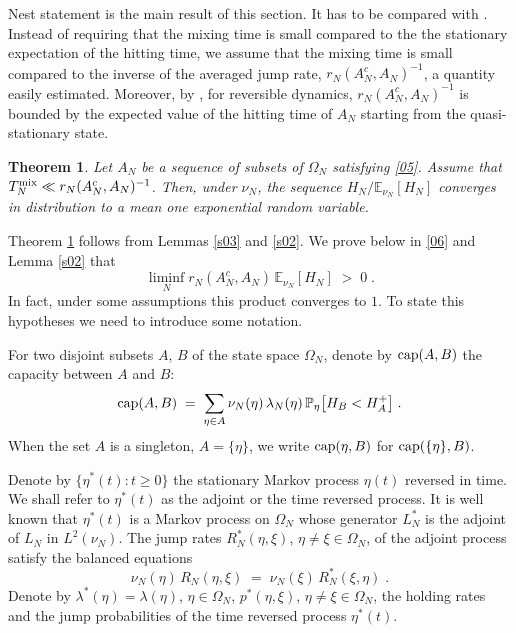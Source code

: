 \documentclass[reqno]{amsart}
\newtheorem{theorem}{Theorem}[section]
\begin{document}
Nest statement is the main result of this section. It has to be
compared with \cite[Theorem 1.4]{a1}. Instead of requiring that the
mixing time is small compared to the the stationary expectation of the
hitting time, we assume that the mixing time is small compared to the
inverse of the averaged jump rate, $r_N(A_N^c, A_N)^{-1}$, a quantity
easily estimated. Moreover, by \cite[Lemma 2.3]{bg1}, for reversible
dynamics, $r_N(A_N^c, A_N)^{-1}$ is bounded by the expected value of
the hitting time of $A_N$ starting from the quasi-stationary state.

\begin{theorem}
\label{s04}
Let $A_N$ be a sequence of subsets of $\Omega_N$ satisfying
\eqref{05}.  Assume that $T^{\rm mix}_N \ll r_N(A_N^c,
A_N)^{-1}$. Then, under $\nu_N$, the sequence $H_N/{{\mathbb E}}_{\nu_N}
[H_N]$ converges in distribution to a mean one exponential random
variable.
\end{theorem}

Theorem \ref{s04} follows from Lemmas \ref{s03} and \ref{s02}.  We
prove below in \eqref{06} and Lemma \ref{s02} that
\begin{equation*}
\liminf_N r_N(A_N^c, A_N) \, {{\mathbb E}}_{\nu_N} [H_N]  \;>\; 0\;.
\end{equation*}
In fact, under some assumptions this product converges to $1$.
To state this hypotheses we need to introduce some notation.

For two disjoint subsets $A$, $B$ of the state space $\Omega_N$,
denote by ${{\rm cap}} (A, B)$ the capacity between $A$ and $B$:
\begin{equation*}
{{\rm cap}} (A, B) \;=\; \sum_{\eta\in A} \nu_N(\eta) \, \lambda_N(\eta)\, 
{{\mathbb P}}_{\eta} \big[ H_B < H^+_{A} \big]\;.
\end{equation*}
When the set $A$ is a singleton, $A=\{\eta\}$, we write ${{\rm cap}}(\eta,
B)$ for ${{\rm cap}} (\{\eta\}, B)$.

Denote by $\{\eta^* (t) : t\ge 0\}$ the stationary Markov process
$\eta(t)$ reversed in time. We shall refer to $\eta^*(t)$ as the
adjoint or the time reversed process. It is well known that
$\eta^*(t)$ is a Markov process on $\Omega_N$ whose generator $L^*_N$
is the adjoint of $L_N$ in $L^2(\nu_N)$.  The jump rates
$R^*_N(\eta,\xi)$, $\eta\not=\xi\in \Omega_N$, of the adjoint process
satisfy the balanced equations
\begin{equation*}
\nu_N(\eta) \, R_N(\eta,\xi) \;=\; \nu_N(\xi) \, R^*_N(\xi,\eta)\;.
\end{equation*}
Denote by $\lambda^*(\eta)=\lambda(\eta)$, $\eta\in \Omega_N$,
$p^*(\eta,\xi)$, $\eta\not=\xi\in \Omega_N$, the holding rates and the
jump probabilities of the time reversed process $\eta^*(t)$.
\end{document}
